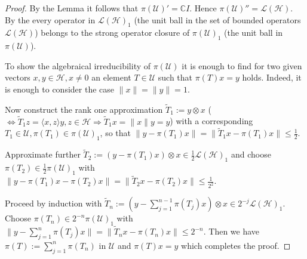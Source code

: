\documentclass[12pt]{article}
\newcommand{\scal}[2]{\langle #1, #2 \rangle}
\theoremstyle{definition}
\theoremstyle{plain}
\begin{document}
\begin{proof}
By the Lemma it follows that $\pi(\mathcal{U})' = \mathbb{C} I$. Hence $\pi(\mathcal{U})'' = \mathcal{L}(\mathcal{H})$. By the  every operator in $\mathcal{L}(\mathcal{H})_1$ (the unit ball in the set of bounded operators $\mathcal{L}(\mathcal{H})$) belongs to the strong operator closure of $\pi(\mathcal{U})_1$ (the unit ball in $\pi(\mathcal{U})$). 

To show the algebraical irreducibility of $\pi(\mathcal{U})$ it is enough to find for two given vectors $x, y \in \mathcal{H}, x \not= 0$ an element $T \in \mathcal{U}$ such that $\pi(T) x = y$ holds. Indeed, it is enough to consider the case $\|x\| = \|y\| = 1$. 

Now construct the rank one approximation $\tilde{T}_1 := y \otimes x$ ($\Leftrightarrow \tilde{T}_1 z = \scal{x}{z} y, z \in \mathcal{H} \Rightarrow \tilde{T}_1 x = \|x\| y = y$) with a corresponding $T_1 \in \mathcal{U}, \pi(T_1) \in \pi(\mathcal{U})_1$, so that $\|y - \pi(T_1) x\| = \|\tilde{T}_1 x - \pi(T_1) x\| \leq \frac{1}{2}$. 

Approximate further $\tilde{T}_2 := (y - \pi(T_1) x) \otimes x \in \frac{1}{2} \mathcal{L}(\mathcal{H})_1$ and choose $\pi(T_2) \in \frac{1}{2} \pi(\mathcal{U})_1$ with $\|y - \pi(T_1) x - \pi(T_2) x\| = \|\tilde{T}_2 x- \pi(T_2) x\| \leq \frac{1}{2^2}$.

Proceed by induction with $\tilde{T}_n := ( y- \sum_{j=1}^{n-1} \pi(T_j) x) \otimes x \in 2^{-j} \mathcal{L}(\mathcal{H})_1$. Choose $\pi(T_n) \in 2^{-n} \pi(\mathcal{U})_1$ with $\|y - \sum_{j=1}^{n} \pi(T_j) x\| = \|\tilde{T}_n x - \pi(T_n) x \| \leq 2^{-n}$. Then we have $\pi(T) := \sum_{j=1}^n \pi(T_n)$ in $\mathcal{U}$ and $\pi(T) x = y$ which completes the proof. 
\end{proof}

\end{document}
